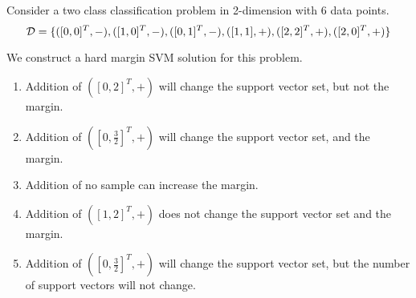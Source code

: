 \begin{frame}
\section{}
Consider a two class classification problem in 2-dimension with 6 data points.
\[ {\cal D} = \{([0,0]^T,-), ([1,0]^T,-), ([0,1]^T,-), ([1,1],+), ([2,2]^T,+), ([2,0]^T,+)  \}\]

We construct a hard margin SVM solution for this problem.
\begin{enumerate}[label=(\Alph*)]
\item Addition of $([0,2]^T,+)$ will change the support vector set, but not the margin.   %
\item Addition of $([0,\frac{3}{2}]^T,+)$ will change the support vector set, and the margin.   %
\item Addition of no sample can increase the margin.
\item Addition of $([1,2]^T,+)$ does not change the support vector set and the margin.  %
\item Addition of $([0,\frac{3}{2}]^T,+)$ will change the support vector set, but the number of support vectors will not change.
\end{enumerate}
\end{frame}
